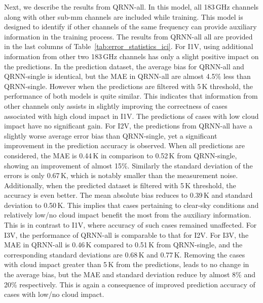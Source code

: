 \documentclass[amt, manuscript]{copernicus}
\begin{document}
Next, we describe the results from QRNN-all. In this model, all 183\,GHz channels along with other sub-mm channels are included while training. This model is designed to identify if other channels of the same frequency can provide auxiliary information in the training process. The results from QRNN-all all are provided in the last columns of Table~\ref{tab:error_statistics_ici}. For I1V, using additional information from other two 183\,GHz channels has only a slight positive impact on the predictions. In the prediction dataset, the average bias for QRNN-all and QRNN-single is identical, but the MAE in QRNN-all are almost 4.5\% less than QRNN-single. However when the predictions are filtered with 5\,K threshold, the performance of both models is quite similar. This indicates that information from other channels only assists in slightly improving the correctness of cases associated with high cloud impact in I1V. The predictions of cases with low cloud impact have no significant gain. For I2V, the predictions from QRNN-all have a slightly worse average error bias than QRNN-single, yet a significant improvement in the prediction accuracy is observed. When all predictions are considered, the MAE is 0.44\,K in comparison to 0.52\,K from QRNN-single, showing an improvement of almost 15\%. Similarly the standard deviation of the errors is only 0.67\,K, which is notably smaller than the measurement noise. Additionally, when the predicted dataset is filtered with 5\,K threshold, the accuracy is even better. The mean absolute bias reduces to 0.39\,K and standard deviation to 0.50\,K. This implies that cases pertaining to clear-sky conditions and relatively low/no cloud impact benefit the most from the auxiliary information. This is in contrast to I1V, where accuracy of such cases remained unaffected. For I3V, the performance of QRNN-all is comparable to that for I2V. For I3V, the MAE in QRNN-all is 0.46\,K compared to 0.51\,K from QRNN-single, and the corresponding standard deviations are 0.68\,K and 0.77\,K. Removing the cases with cloud impact greater than 5\,K from the predictions, leads to no change in the average bias, but the MAE and standard deviation reduce by almost  8\% and 20\% respectively. This is again a consequence of improved prediction accuracy of cases with low/no cloud impact.  
\end{document}
